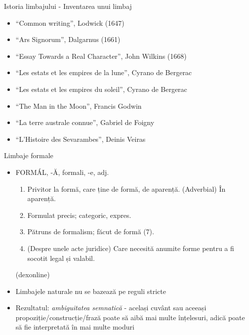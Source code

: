 \documentclass[pdf]{beamer}
\begin{document}
\begin{frame}{Istoria limbajului - Inventarea unui limbaj}
\begin{itemize}
\item
“Common writing”, Lodwick (1647)
\item
“Ars Signorum”, Dalgarnus (1661)
\item
“Essay Towards a Real Character”, John Wilkins (1668)
\newline
\item
“Les estats et les empires de la lune”, Cyrano de Bergerac
\item
“Les estats et les empires du soleil”, Cyrano de Bergerac
\item
“The Man in the Moon”, Francis Godwin
\item
“La terre australe connue”, Gabriel de Foigny
\item
“L’Histoire des Sevarambes”, Deinis Veiras
\end{itemize}
\end{frame}



\begin{frame}{Limbaje formale}
\begin{itemize}
\item
FORMÁL, -Ă, formali, -e, adj. 
\begin{enumerate}
\item
Privitor la formă, care ține de formă, de aparență. (Adverbial) În aparență. 
\item
Formulat precis; categoric, expres. 
\item
Pătruns de formalism; făcut de formă (7). 
\item
(Despre unele acte juridice) Care necesită anumite forme pentru a fi socotit legal și valabil.
\end{enumerate}
(dexonline)
\item
Limbajele naturale nu se bazează pe reguli stricte
\item
Rezultatul: \textit{ambiguitatea semnatică} - același cuvânt sau aceeași propoziție/construcție/frază poate să aibă mai multe înțelesuri, adică poate să fie interpretată în mai multe moduri
\end{itemize}
\end{frame}
\end{document}
